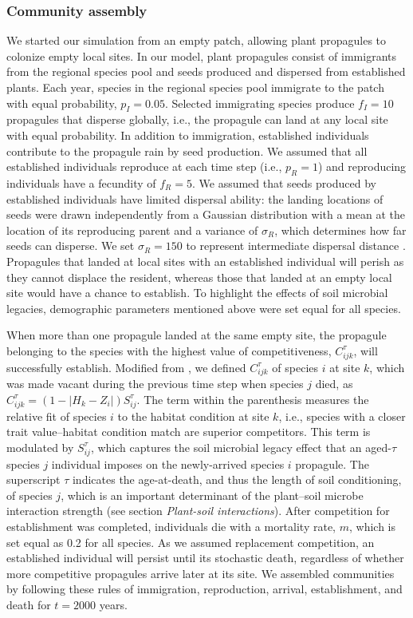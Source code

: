 \subsubsection*{Community assembly}
We started our simulation from an empty patch, allowing plant propagules to colonize empty local sites. In our model, plant propagules consist of immigrants from the regional species pool and seeds produced and dispersed from established plants.
Each year, species in the regional species pool immigrate to the patch with equal probability, $p_{I} = 0.05$. Selected immigrating species produce $f_{I} = 10$ propagules that disperse globally, i.e., the propagule can land at any local site with equal probability.
In addition to immigration, established individuals contribute to the propagule rain by seed production. We assumed that all established individuals reproduce at each time step (i.e., $p_{R} = 1$) and reproducing individuals have a fecundity of $f_{R} = 5$.
We assumed that seeds produced by established individuals have limited dispersal ability: the landing locations of seeds were drawn independently from a Gaussian distribution with a mean at the location of its reproducing parent and a variance of $\sigma_{R}$, which determines how far seeds can disperse. We set $\sigma_{R} = 150$ to represent intermediate dispersal distance \citep{ZeeFukami2015}.
Propagules that landed at local sites with an established individual will perish as they cannot displace the resident, whereas those that landed at an empty local site would have a chance to establish.
To highlight the effects of soil microbial legacies, demographic parameters mentioned above were set equal for all species.
\par


When more than one propagule landed at the same empty site, the propagule belonging to the species with the highest value of competitiveness, $C_{ijk}^{\tau}$, will successfully establish. 
Modified from \citet{Fukami2013}, we defined $C_{ijk}^{\tau}$ of species $i$ at site $k$, which was made vacant during the previous time step when species $j$ died, as $C_{ijk}^{\tau} = \left ( 1 - \left | H_{k} - Z_{i} \right | \right )S_{ij}^{\tau}$. 
The term within the parenthesis measures the relative fit of species $i$ to the habitat condition at site $k$, i.e., species with a closer trait value--habitat condition match are superior competitors. 
This term is modulated by $S_{ij}^{\tau}$, which captures the soil microbial legacy effect that an aged-$\tau$ species $j$ individual imposes on the newly-arrived species $i$ propagule. The superscript $\tau$ indicates the age-at-death, and thus the length of soil conditioning, of species $j$, which is an important determinant of the plant--soil microbe interaction strength (see section \textit{Plant-soil interactions}).
After competition for establishment was completed, individuals die with a mortality rate, $m$, which is set equal as 0.2 for all species. As we assumed replacement competition, an established individual will persist until its stochastic death, regardless of whether more competitive propagules arrive later at its site.
We assembled communities by following these rules of immigration, reproduction, arrival, establishment, and death for $t = 2000$ years. 
\par


